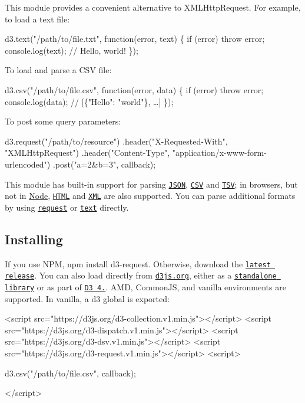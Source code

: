 This module provides a convenient alternative to X\+M\+L\+Http\+Request. For example, to load a text file\+:


\begin{DoxyCode}
d3.text("/path/to/file.txt", function(error, text) \{
  if (error) throw error;
  console.log(text); // Hello, world!
\});
\end{DoxyCode}


To load and parse a C\+SV file\+:


\begin{DoxyCode}
d3.csv("/path/to/file.csv", function(error, data) \{
  if (error) throw error;
  console.log(data); // [\{"Hello": "world"\}, …]
\});
\end{DoxyCode}


To post some query parameters\+:


\begin{DoxyCode}
d3.request("/path/to/resource")
    .header("X-Requested-With", "XMLHttpRequest")
    .header("Content-Type", "application/x-www-form-urlencoded")
    .post("a=2&b=3", callback);
\end{DoxyCode}


This module has built-\/in support for parsing \href{#json}{\tt J\+S\+ON}, \href{#csv}{\tt C\+SV} and \href{#tsv}{\tt T\+SV}; in browsers, but not in \mbox{\hyperlink{classNode}{Node}}, \href{#html}{\tt H\+T\+ML} and \href{#xml}{\tt X\+ML} are also supported. You can parse additional formats by using \href{#request}{\tt request} or \href{#text}{\tt text} directly.

\subsection*{Installing}

If you use N\+PM, {\ttfamily npm install d3-\/request}. Otherwise, download the \href{https://github.com/d3/d3-request/releases/latest}{\tt latest release}. You can also load directly from \href{https://d3js.org}{\tt d3js.\+org}, either as a \href{https://d3js.org/d3-request.v1.min.js}{\tt standalone library} or as part of \href{https://github.com/d3/d3}{\tt D3 4.}. A\+MD, Common\+JS, and vanilla environments are supported. In vanilla, a {\ttfamily d3} global is exported\+:


\begin{DoxyCode}
<script src="https://d3js.org/d3-collection.v1.min.js"></script>
<script src="https://d3js.org/d3-dispatch.v1.min.js"></script>
<script src="https://d3js.org/d3-dsv.v1.min.js"></script>
<script src="https://d3js.org/d3-request.v1.min.js"></script>
<script>

d3.csv("/path/to/file.csv", callback);

</script>
\end{DoxyCode}


